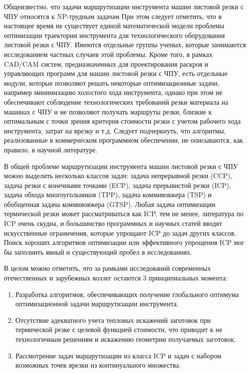 Общеизвестно, 
что задачи маршрутизации инструмента машин листовой резки с ЧПУ относятся к 
NP-трудным задачам 
При этом следует отметить, что в настоящее время не существует единой математической модели 
проблемы оптимизации траектории инструмента для технологического оборудования листовой резки с ЧПУ. 
Имеются отдельные группы ученых, которые занимаются исследованием частных случаев этой проблемы. 
Кроме того, в рамках CAD/CAM систем, 
предназначенных для проектирования раскроя и управляющих программ для машин листовой резки с ЧПУ, 
есть отдельные модули, которые позволяют решать некоторые оптимизационные задачи, 
например минимизацию холостого хода инструмента, 
однако при этом не обеспечивают соблюдение технологических требований резки материала на машинах с ЧПУ 
и не позволяют получать маршруты резки, 
близкие к оптимальным с точки зрения критерия стоимости резки с учетом рабочего хода инструмента, 
затрат на врезку и т.д. 
Следует подчеркнуть, 
что алгоритмы, реализованные в коммерческом программном обеспечении, 
не описываются, как правило, в научной литературе.

В общей проблеме маршрутизации инструмента машин листовой резки с ЧПУ
можно выделить несколько классов задач: 
задача непрерывной резки (CCP), 
задача резки с конечными точками (ECP), 
задача прерывистой резки (ICP), 
задача обхода многоугольников (TPP), 
задача коммивояжера (TSP) 
и обобщенная задача коммивояжера (GTSP). 
Любая задача оптимизации термической резки может рассматриваться как ICP,
тем не менее, литература по ICP очень скудна, 
и большинство программных и научных статей вводят искусственные ограничения, 
которые упрощают ICP до задач других классов. 
Поиск хороших алгоритмов оптимизации или эффективного упрощения ICP
мог бы заполнить явный и существующий пробел в исследованиях. 

В целом можно отметить, 
что за рамками исследований современных отечественных и зарубежных коллег остаются 3 принципиальных момента:
\begin{enumerate}
    \item
    Разработка алгоритмов, обеспечивающих получение глобального оптимума 
    оптимизационной задачи маршрутизации инструмента.    
    \item
    Отсутствие адекватного учета тепловых искажений заготовок при термической резке 
    с целевой функцией стоимости, что приводит к не технологичным решениям 
    и искажению геометрии получаемых заготовок.
    \item
    Рассмотрение задач маршрутизации из класса ICP 
    и задач с набором возможных точек врезки из континуального множества.
\end{enumerate}

